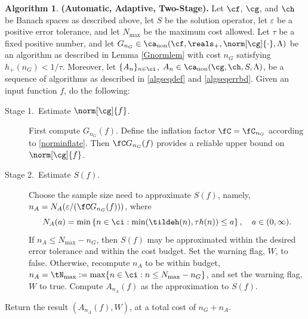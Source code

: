 \documentclass[]{elsarticle}
\DeclareMathOperator{\fix}{non}
\theoremstyle{definition}
\newtheorem{algo}{Algorithm}
\theoremstyle{remark}
\begin{document}
\begin{algo} \label{twostagedetalgo} {\bf (Automatic, Adaptive, Two-Stage).} Let $\cf$, $\cg$, and $\ch$ be Banach spaces as described above, let $S$ be the solution operator, let $\varepsilon$ be a positive error tolerance, and let $N_{\max}$ be the maximum cost allowed.  Let $\tau$ be a fixed positive number, and let $G_{n_G} \in \ca_{\fix}(\cf,\reals_+,\norm[\cg]{\cdot},\Lambda)$ be an algorithm as described in Lemma \ref{Gnormlem} with cost $n_G$ satisfying $h_{+}(n_G) < 1/\tau$.
Moreover, let  $\{A_n\}_{n \in \ci}$, $A_n  \in \ca_{\fix}(\cg,\ch,S,\Lambda)$, be a sequence of algorithms as described in \eqref{algseqdef} and \eqref{algseqerrbd}.  Given an input function $f$, do the following:

\begin{description} 

\item[Stage 1.\ Estimate {$\norm[\cg]{f}$}.] First compute $G_{n_G}(f)$.  Define the inflation factor $\fC=\fC_{n_G}$ according to \eqref{norminflate}.
Then $\fC G_{n_G}(f)$ provides a reliable upper bound on $\norm[\cg]{f}$.  

\item [Stage 2.\ Estimate {$S(f)$}.] Choose the sample size need to approximate $S(f)$, namely, $n_A=N_{A}(\varepsilon/(\fC G_{n_G}(f)))$, where 
\begin{equation} \label{Nmindef}
N_{A}(a)= \min\left\{ n \in \ci : \min(\tildeh(n),\tau h(n)) \le a \right\}, \quad a \in (0,\infty).
\end{equation}
If $n_A \le N_{\max}-n_G$, then $S(f)$ may be approximated within the desired error tolerance and within the cost budget.  Set the warning flag, $W$, to false. Otherwise, recompute $n_A$ to be within budget, $n_A = \tN_{\max} := \max\{n \in \ci : n\le N_{\max} -  n_G\}$, and set the warning flag, $W$ to true.  Compute $A_{n_A}(f)$ as the approximation to $S(f)$.
\end{description}

Return the result $(A_{n_A}(f),W)$, at a total cost of $n_G+n_A$.  
\end{algo}
\end{document}
